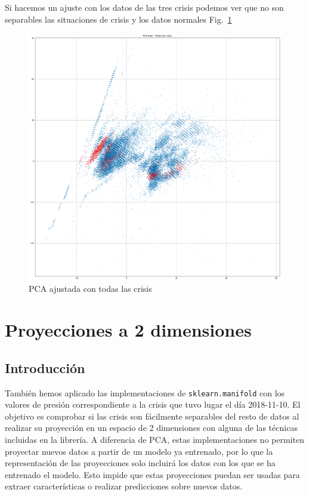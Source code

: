 \documentclass[a4paper,12pt,twoside,oldfontcommands]{memoir}
\begin{document}
Si hacemos un ajuste con los datos de las tres crisis podemos ver que no son separables las situaciones de crisis y los datos normales Fig.~\ref{fig:pca_crisis_full}
\begin{figure}
    \centering
    \includegraphics[width=\textwidth]{images/PCA-crisisFull.png}
    \caption{PCA ajustada con todas las crisis}
    \label{fig:pca_crisis_full}
\end{figure}
\chapter{Proyecciones a 2 dimensiones}
\section{Introducción}
También hemos aplicado las implementaciones de \texttt{sklearn.manifold} con los valores de presión correspondiente a la crisis que tuvo lugar el día 2018-11-10. El objetivo es comprobar si las crisis son fácilmente separables del resto de datos al realizar su proyección en un espacio de 2 dimensiones con alguna de las técnicas incluidas en la librería. A diferencia de PCA, estas implementaciones no permiten proyectar nuevos datos a partir de un modelo ya entrenado, por lo que la representación de las proyecciones solo incluirá los datos con los que se ha entrenado el modelo. Esto impide que estas proyecciones puedan ser usadas para extraer características o realizar predicciones sobre nuevos datos.
\end{document}
